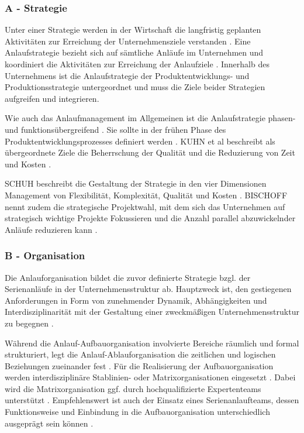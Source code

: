 \subsubsection*{A - Strategie}
Unter einer Strategie werden in der Wirtschaft die langfristig geplanten Aktivitäten zur Erreichung der Unternehmensziele verstanden \cite[12]{Schuh2008}. %
% 
Eine Anlaufstrategie bezieht sich auf sämtliche Anläufe im Unternehmen und koordiniert die Aktivitäten zur Erreichung der Anlaufziele \cite[4]{Schuh2008}. Innerhalb des Unternehmens ist die Anlaufstrategie der Produktentwicklungs- und Produktionsstrategie untergeordnet und muss die Ziele beider Strategien aufgreifen und integrieren. 
	

Wie auch das Anlaufmanagement im Allgemeinen ist die Anlaufstrategie phasen- und funktionsübergreifend \cite{Pfohl2000}. 
Sie sollte in der frühen Phase des Produktentwicklungsprozesses definiert werden \cite{Schuh2004}. 
KUHN et al beschreibt als übergeordnete Ziele die Beherrschung der Qualität und die Reduzierung von Zeit und Kosten \cite[4]{Kuhn2002}. 

SCHUH beschreibt die Gestaltung der Strategie in den vier Dimensionen Management von Flexibilität, Komplexität, Qualität und Kosten \cite[13]{Schuh2008}. BISCHOFF nennt zudem die strategische Projektwahl, mit dem sich das Unternehmen auf strategisch wichtige Projekte Fokussieren und die Anzahl parallel abzuwickelnder Anläufe reduzieren kann \cite[43]{Bischoff2007}. 

\subsubsection*{B - Organisation}
Die Anlauforganisation bildet die zuvor definierte Strategie bzgl. der Serienanläufe in der Unternehmensstruktur ab. Hauptzweck ist, den gestiegenen Anforderungen in Form von zunehmender Dynamik, Abhängigkeiten und Interdisziplinarität mit der Gestaltung einer zweckmäßigen Unternehmensstruktur zu begegnen \cite[55]{Schuh2008}. 

Während die Anlauf-Aufbauorganisation involvierte Bereiche räumlich und formal strukturiert, legt die Anlauf-Ablauforganisation die zeitlichen und logischen Beziehungen zueinander fest \cite[55]{Schuh2008}.
Für die Realisierung der Aufbauorganisation werden interdisziplinäre Stablinien- oder Matrixorganisationen eingesetzt \cite[77]{Bischoff2007}. Dabei wird die Matrixorganisation ggf. durch hochqualifizierte Expertenteams unterstützt \cite[4]{Schmitt2015}. 
Empfehlenswert ist auch der Einsatz eines Serienanlaufteams, dessen Funktionsweise und Einbindung in die Aufbauorganisation unterschiedlich ausgeprägt sein können \cite[79]{Bischoff2007}. 

